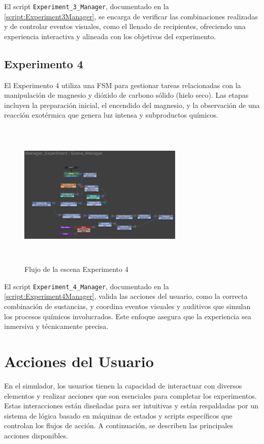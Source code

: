 El script \texttt{Experiment\_3\_Manager}, documentado en la \autoref{script:Experiment3Manager}, se encarga de verificar las combinaciones realizadas y de controlar eventos visuales, como el llenado de recipientes, ofreciendo una experiencia interactiva y alineada con los objetivos del experimento.

\subsection{Experimento 4}
El Experimento 4 utiliza una FSM para gestionar tareas relacionadas con la manipulación de magnesio y dióxido de carbono sólido (hielo seco). Las etapas incluyen la preparación inicial, el encendido del magnesio, y la observación de una reacción exotérmica que genera luz intensa y subproductos químicos.
\begin{figure}[thbp]
    \centering
    \includegraphics[width=0.7\textwidth, height = 7cm]{img/chapter05/Experimento_04.png}
    \caption{Flujo de la escena Experimento 4}
    \label{fig:FSM_E4}
\end{figure}

El script \texttt{Experiment\_4\_Manager}, documentado en la \autoref{script:Experiment4Manager},  valida las acciones del usuario, como la correcta combinación de sustancias, y coordina eventos visuales y auditivos que simulan los procesos químicos involucrados. Este enfoque asegura que la experiencia sea inmersiva y técnicamente precisa.
\newpage
\section{Acciones del Usuario}
En el simulador, los usuarios tienen la capacidad de interactuar con diversos elementos y realizar acciones que son esenciales para completar los experimentos. Estas interacciones están diseñadas para ser intuitivas y están respaldadas por un sistema de lógica basado en máquinas de estados y scripts específicos que controlan los flujos de acción. A continuación, se describen las principales acciones disponibles.
